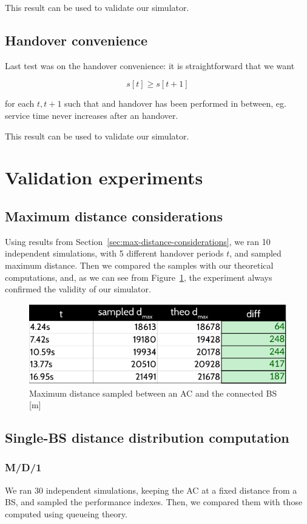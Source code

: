 \documentclass[a4paper,12pt]{article}
\begin{document}
This result can be used to validate our simulator.

\subsection{Handover convenience}
\label{sec:handover-convenience}
Last test was on the handover convenience: it is straightforward that we want

$$ s[t] \geq s[t + 1] $$

for each $t, t + 1$ such that and handover has been performed in between, eg. service time never increases after an handover.

This result can be used to validate our simulator.

\section{Validation experiments}
\subsection{Maximum distance considerations}
Using results from Section~\ref{sec:max-distance-considerations}, we ran 10 independent simulations, with 5 different handover periods $t$, and sampled maximum distance.
Then we compared the samples with our theoretical computations, and, as we can see from Figure~\ref{fig:dmax-validation}, the experiment always confirmed the validity of our simulator.
\begin{figure}[H]
  \centering
  \includegraphics{img/dmax-validation.pdf}
  \caption{Maximum distance sampled between an AC and the connected BS [m]}
  \label{fig:dmax-validation}
\end{figure}

\subsection{Single-BS distance distribution computation}
\subsubsection{M/D/1}
We ran 30 independent simulations, keeping the AC at a fixed distance from a BS, and sampled the performance indexes.
Then, we compared them with those computed using queueing theory.
\end{document}
